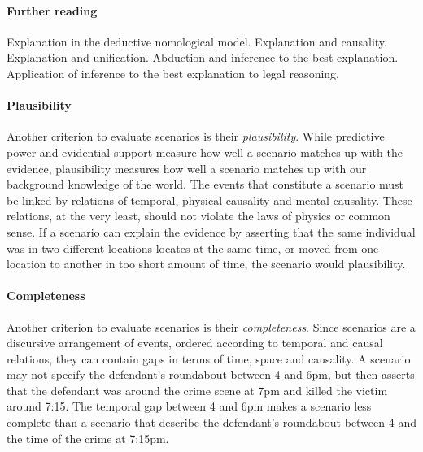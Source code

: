 \documentclass[10pt]{article}
\begin{document}
\paragraph{Further reading}

Explanation in the deductive nomological model. 
Explanation and causality. Explanation and unification. 
Abduction and inference to the best explanation.
Application of inference to the best explanation 
to legal reasoning.







\paragraph{Plausibility}

Another criterion to evaluate scenarios is their \textit{plausibility}. 
While predictive power and evidential support measure how well a 
scenario matches up with the evidence, plausibility measures how well a scenario matches up with 
our background knowledge of the world. The events that constitute a scenario must be linked by relations of temporal, physical causality 
and mental causality. These relations, at the very least, should not violate the laws of physics or common sense. 
If a scenario can explain the evidence by asserting that the same individual was in two different locations 
locates at the same time, or moved from one location to another in too short amount of time, 
the scenario would plausibility. 

\paragraph{Completeness}

Another criterion to evaluate scenarios is their \textit{completeness}.
Since scenarios are a discursive arrangement of events, ordered according to 
temporal and causal relations, they can contain gaps in terms of time, 
space and causality. A scenario may not specify
the defendant's roundabout between 4 and 6pm, but then asserts that the defendant was around the crime scene 
at 7pm and killed the victim around 
7:15. The temporal gap between 4 and 6pm makes a scenario 
less complete than a scenario that describe the defendant's
roundabout between 4 and the time of the crime at 7:15pm. 

 
\end{document}
